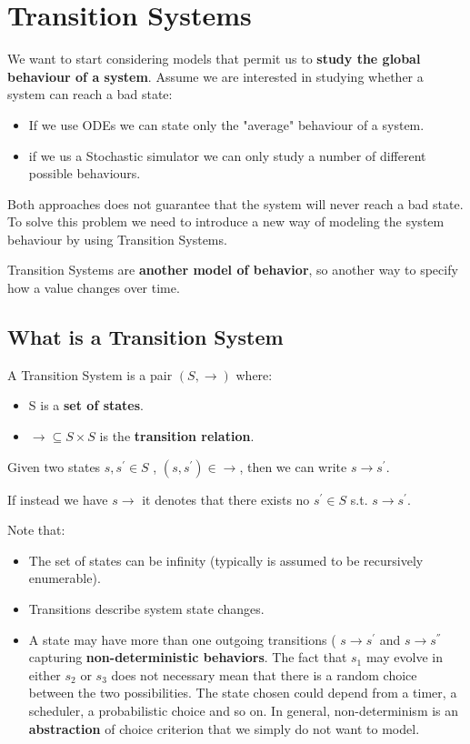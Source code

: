 \chapter{Transition Systems}
We want to start considering models that permit us to \textbf{study the global behaviour of a system}. Assume we are interested in studying whether a system can reach a bad state:
\begin{itemize}
    \item If we use ODEs we can state only the "average" behaviour of a system.
    \item if we us a Stochastic simulator we can only study a number of different possible behaviours.
\end{itemize}
Both approaches does not guarantee that the system will never reach a bad state. To solve this problem we need to introduce a new way of modeling the system behaviour by using Transition Systems.\par
Transition Systems are \textbf{another model of behavior}, so another way to specify how a value changes over time.

\section{What is a Transition System}
A Transition System is a pair $(S, \rightarrow)$ where:
\begin{itemize}
    \item S is a \textbf{set of states}.
    \item $\rightarrow \subseteq S \times S$ is the \textbf{transition relation}.
\end{itemize}

Given two states $s, s^{'} \in S$ , $(s, s^{'}) \in \rightarrow$, 
then we can write $s \rightarrow s^{'}$. \par
If instead we have $s \rightarrow$ it denotes that there exists no $s^{'} \in S$ s.t. $s \rightarrow s^{'}$. \par
Note that:

\begin{itemize}
    \item The set of states can be infinity (typically is assumed to be recursively enumerable).
    \item Transitions describe system state changes.
    \item A state may have more than one outgoing transitions ( $s \rightarrow s^{'}$ and $s \rightarrow s^{''}$ capturing \textbf{non-deterministic behaviors}. The fact that $s_{1}$ may evolve in either $s_{2}$ or $s_{3}$ does not necessary mean that there is a random choice between the two possibilities. The state chosen could depend from a timer, a scheduler, a probabilistic choice and so on. In general, non-determinism is an \textbf{abstraction} of choice criterion that we simply do not want to model.
\end{itemize}

